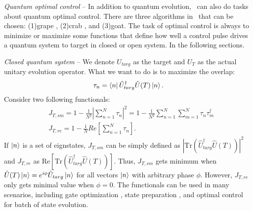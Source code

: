 \textit{Quantum optimal control} -- In addition to quantum evolution, \MindQuantum\ can also do tasks about quantum optimal control. There are three algorithms in \MindQuantum\ that can be chosen: (1)grape \cite{GRAPE_0, GRAPE_2}, (2)crab \cite{CRAB_0, CRAB_1}, and (3)goat. The task of optimal control is always to minimize or maximize some functions that define how well a control pulse drives a quantum system to target in closed or open system. In the following sections.

\textit{Closed quantum system} -- We denote $U_{targ}$ as the target and $U_{T}$ as the actual unitary evolution operator. What we want to do is to maximize the overlap:
\begin{equation}
    \tau_{n}=\bra{n}\hat{U}_{targ}^{\dagger}\hat{U}(T)\ket{n}.
\end{equation}
Consider two following functionals:
\begin{equation}
    \begin{split}
        &J_{T,sm}=1-\frac{1}{N^{2}}\left|\sum_{n=1}^{N}\tau_{n}\right|^{2}=1-\frac{1}{N^{2}}\sum_{n=1}^{N}\sum_{m=1}^{N}\tau_{n}\tau_{m}^{\dagger}\\
        &J_{T,re}=1-\frac{1}{N}Re\left[\sum_{n=1}^{N}\tau_{n}\right].
    \end{split}
    \label{close}
\end{equation}
If ${\ket{n}}$ is a set of eignstates, $J_{T,sm}$ can be simply defined as $\left|\text{Tr}(\hat{U}_{targ}^{\dagger}\hat{U}(T))\right|^{2}$ and $J_{T,re}$ as $\text{Re}[\text{Tr}(\hat{U}^{\dagger}_{targ}\hat{U}(T))]$. Thus, $J_{T,sm}$ gets minimum when $\hat{U}(T)\ket{n}=e^{i\phi}\hat{U}_{targ}\ket{n}$ for all vectors $\ket{n}$ with arbitrary phase $\phi$. However, $J_{T,re}$ only gets minimal value when $\phi=0$. The functionals can be used in many scenarios, including gate optimization \cite{He_2024}, state preparation \cite{He_2021, refId0}, and optimal control for batch of state evolution.


